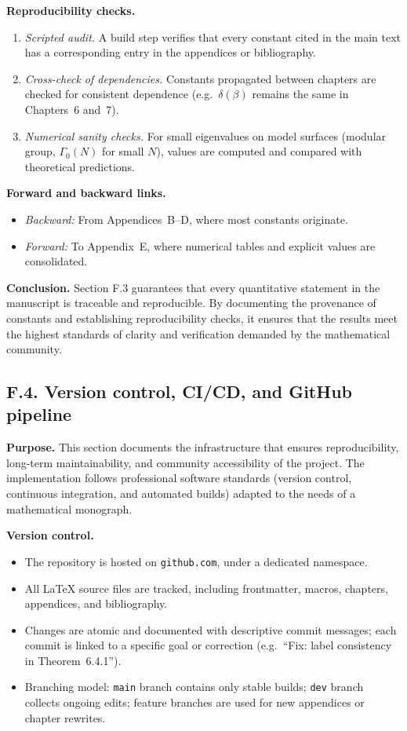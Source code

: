 \medskip
\noindent \textbf{Reproducibility checks.}
\begin{enumerate}
  \item \emph{Scripted audit.} A build step verifies that every constant cited in the main text has a corresponding entry in the appendices or bibliography.
  \item \emph{Cross-check of dependencies.} Constants propagated between chapters are checked for consistent dependence (e.g.\ $\delta(\beta)$ remains the same in Chapters~6 and~7).
  \item \emph{Numerical sanity checks.} For small eigenvalues on model surfaces (modular group, $\Gamma_0(N)$ for small $N$), values are computed and compared with theoretical predictions.
\end{enumerate}

\medskip
\noindent \textbf{Forward and backward links.}
\begin{itemize}
  \item \emph{Backward:} From Appendices~B–D, where most constants originate.
  \item \emph{Forward:} To Appendix~E, where numerical tables and explicit values are consolidated.
\end{itemize}

\medskip
\noindent \textbf{Conclusion.}
Section F.3 guarantees that every quantitative statement in the manuscript is traceable and reproducible. By documenting the provenance of constants and establishing reproducibility checks, it ensures that the results meet the highest standards of clarity and verification demanded by the mathematical community.

\subsection*{F.4. Version control, CI/CD, and GitHub pipeline}

\noindent \textbf{Purpose.}
This section documents the infrastructure that ensures reproducibility, long-term maintainability, and community accessibility of the project. The implementation follows professional software standards (version control, continuous integration, and automated builds) adapted to the needs of a mathematical monograph.

\medskip
\noindent \textbf{Version control.}
\begin{itemize}
  \item The repository is hosted on \texttt{github.com}, under a dedicated namespace. 
  \item All \LaTeX{} source files are tracked, including frontmatter, macros, chapters, appendices, and bibliography.
  \item Changes are atomic and documented with descriptive commit messages; each commit is linked to a specific goal or correction (e.g.\ ``Fix: label consistency in Theorem~6.4.1'').
  \item Branching model: \texttt{main} branch contains only stable builds; \texttt{dev} branch collects ongoing edits; feature branches are used for new appendices or chapter rewrites.
\end{itemize}

